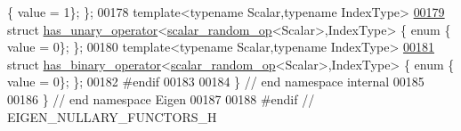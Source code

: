 \begin{DoxyCode}
      \{ value = 1\}; \};
00178 \textcolor{keyword}{template}<\textcolor{keyword}{typename} Scalar,\textcolor{keyword}{typename} IndexType>
\hyperlink{struct_eigen_1_1internal_1_1has__unary__operator_3_01scalar__random__op_3_01_scalar_01_4_00_01_index_type_01_4}{00179} \textcolor{keyword}{struct }\hyperlink{struct_eigen_1_1internal_1_1has__unary__operator}{has\_unary\_operator}<\hyperlink{struct_eigen_1_1internal_1_1scalar__random__op}{scalar\_random\_op}<Scalar>,IndexType> \{ \textcolor{keyword}{enum} \{ 
      value = 0\}; \};
00180 \textcolor{keyword}{template}<\textcolor{keyword}{typename} Scalar,\textcolor{keyword}{typename} IndexType>
\hyperlink{struct_eigen_1_1internal_1_1has__binary__operator_3_01scalar__random__op_3_01_scalar_01_4_00_01_index_type_01_4}{00181} \textcolor{keyword}{struct }\hyperlink{struct_eigen_1_1internal_1_1has__binary__operator}{has\_binary\_operator}<\hyperlink{struct_eigen_1_1internal_1_1scalar__random__op}{scalar\_random\_op}<Scalar>,IndexType> \{ \textcolor{keyword}{enum} \{ 
      value = 0\}; \};
00182 \textcolor{preprocessor}{#endif}
00183 
00184 \} \textcolor{comment}{// end namespace internal}
00185 
00186 \} \textcolor{comment}{// end namespace Eigen}
00187 
00188 \textcolor{preprocessor}{#endif // EIGEN\_NULLARY\_FUNCTORS\_H}
\end{DoxyCode}
